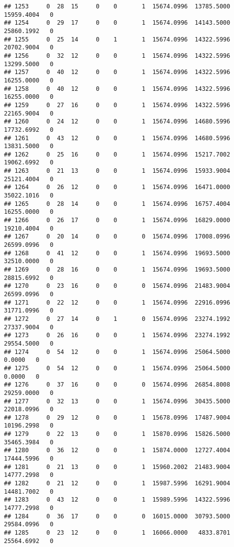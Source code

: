 \documentclass[
]{article}
\begin{document}
\begin{enumerate}
\begin{verbatim}
## 1253     0  28  15     0    0       1  15674.0996  13785.5000  15959.4004   0
## 1254     0  29  17     0    0       1  15674.0996  14143.5000  25860.1992   0
## 1255     0  25  14     0    1       1  15674.0996  14322.5996  20702.9004   0
## 1256     0  32  12     0    0       1  15674.0996  14322.5996  13299.5000   0
## 1257     0  40  12     0    0       1  15674.0996  14322.5996  16255.0000   0
## 1258     0  40  12     0    0       1  15674.0996  14322.5996  16255.0000   0
## 1259     0  27  16     0    0       1  15674.0996  14322.5996  22165.9004   0
## 1260     0  24  12     0    0       1  15674.0996  14680.5996  17732.6992   0
## 1261     0  43  12     0    0       1  15674.0996  14680.5996  13831.5000   0
## 1262     0  25  16     0    0       1  15674.0996  15217.7002  19062.6992   0
## 1263     0  21  13     0    0       1  15674.0996  15933.9004  25121.4004   0
## 1264     0  26  12     0    0       1  15674.0996  16471.0000  35022.1016   0
## 1265     0  28  14     0    0       1  15674.0996  16757.4004  16255.0000   0
## 1266     0  26  17     0    0       1  15674.0996  16829.0000  19210.4004   0
## 1267     0  20  14     0    0       0  15674.0996  17008.0996  26599.0996   0
## 1268     0  41  12     0    0       1  15674.0996  19693.5000  32510.0000   0
## 1269     0  28  16     0    0       1  15674.0996  19693.5000  28815.6992   0
## 1270     0  23  16     0    0       0  15674.0996  21483.9004  26599.0996   0
## 1271     0  22  12     0    0       1  15674.0996  22916.0996  31771.0996   0
## 1272     0  27  14     0    1       0  15674.0996  23274.1992  27337.9004   0
## 1273     0  26  16     0    0       1  15674.0996  23274.1992  29554.5000   0
## 1274     0  54  12     0    0       1  15674.0996  25064.5000      0.0000   0
## 1275     0  54  12     0    0       1  15674.0996  25064.5000      0.0000   0
## 1276     0  37  16     0    0       0  15674.0996  26854.8008  29259.0000   0
## 1277     0  32  13     0    0       1  15674.0996  30435.5000  22018.0996   0
## 1278     0  29  12     0    0       1  15678.0996  17487.9004  10196.2998   0
## 1279     0  22  13     0    0       1  15870.0996  15826.5000  35465.3984   0
## 1280     0  36  12     0    0       1  15874.0000  12727.4004  17444.5996   0
## 1281     0  21  13     0    0       1  15960.2002  21483.9004  14777.2998   0
## 1282     0  21  12     0    0       1  15987.5996  16291.9004  14481.7002   0
## 1283     0  43  12     0    0       1  15989.5996  14322.5996  14777.2998   0
## 1284     0  36  17     0    0       0  16015.0000  30793.5000  29584.0996   0
## 1285     0  23  12     0    0       1  16066.0000   4833.8701  25564.6992   0

\end{verbatim}
\end{enumerate}
\end{document}
